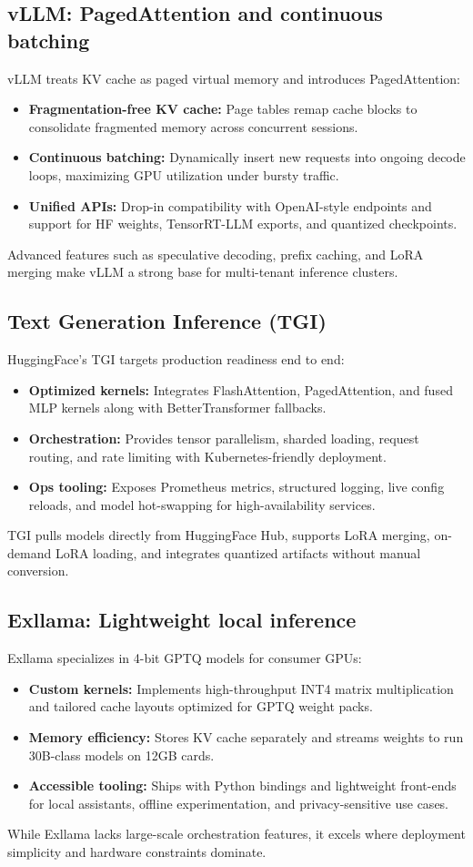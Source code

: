 \documentclass{article}
\begin{document}
\subsection{vLLM: PagedAttention and continuous batching}
vLLM treats KV cache as paged virtual memory and introduces PagedAttention:
\begin{itemize}
  \item \textbf{Fragmentation-free KV cache:} Page tables remap cache blocks to consolidate fragmented memory across concurrent sessions.
  \item \textbf{Continuous batching:} Dynamically insert new requests into ongoing decode loops, maximizing GPU utilization under bursty traffic.
  \item \textbf{Unified APIs:} Drop-in compatibility with OpenAI-style endpoints and support for HF weights, TensorRT-LLM exports, and quantized checkpoints.
\end{itemize}
Advanced features such as speculative decoding, prefix caching, and LoRA merging make vLLM a strong base for multi-tenant inference clusters.

\subsection{Text Generation Inference (TGI)}
HuggingFace's TGI targets production readiness end to end:
\begin{itemize}
  \item \textbf{Optimized kernels:} Integrates FlashAttention, PagedAttention, and fused MLP kernels along with BetterTransformer fallbacks.
  \item \textbf{Orchestration:} Provides tensor parallelism, sharded loading, request routing, and rate limiting with Kubernetes-friendly deployment.
  \item \textbf{Ops tooling:} Exposes Prometheus metrics, structured logging, live config reloads, and model hot-swapping for high-availability services.
\end{itemize}
TGI pulls models directly from HuggingFace Hub, supports LoRA merging, on-demand LoRA loading, and integrates quantized artifacts without manual conversion.

\subsection{Exllama: Lightweight local inference}
Exllama specializes in 4-bit GPTQ models for consumer GPUs:
\begin{itemize}
  \item \textbf{Custom kernels:} Implements high-throughput INT4 matrix multiplication and tailored cache layouts optimized for GPTQ weight packs.
  \item \textbf{Memory efficiency:} Stores KV cache separately and streams weights to run 30B-class models on 12GB cards.
  \item \textbf{Accessible tooling:} Ships with Python bindings and lightweight front-ends for local assistants, offline experimentation, and privacy-sensitive use cases.
\end{itemize}
While Exllama lacks large-scale orchestration features, it excels where deployment simplicity and hardware constraints dominate.
\end{document}
